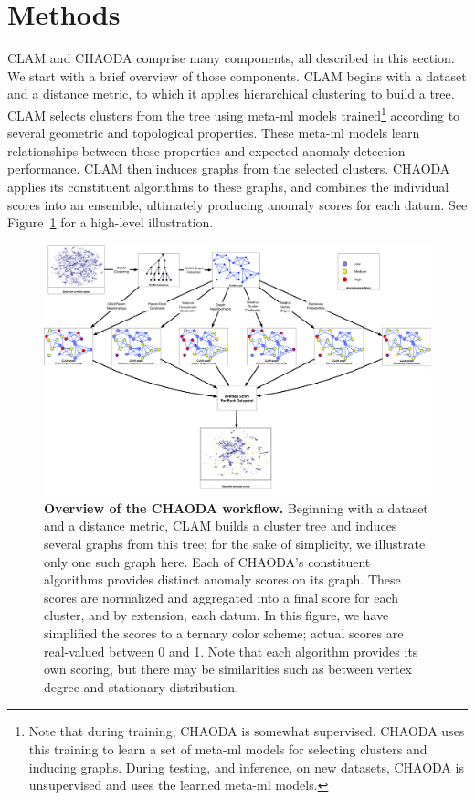 \section{Methods}
\label{sec:methods}

CLAM and CHAODA comprise many components, all described in this section.
We start with a brief overview of those components.
CLAM begins with a dataset and a distance metric, to which it applies hierarchical clustering to build a tree.
CLAM selects clusters from the tree using meta-ml models trained\footnote{Note that during training, CHAODA is somewhat supervised.
CHAODA uses this training to learn a set of meta-ml models for selecting clusters and inducing graphs.
During testing, and inference, on new datasets, CHAODA is unsupervised and uses the learned meta-ml models.} according to several geometric and topological properties.
These meta-ml models learn relationships between these properties and expected anomaly-detection performance.
CLAM then induces graphs from the selected clusters.
CHAODA applies its constituent algorithms to these graphs, and combines the individual scores into an ensemble, ultimately producing anomaly scores for each datum.
See Figure~\ref{fig:methods:chaoda-workflow} for a high-level illustration.


\begin{figure}[ht!]
    \centering
    \includegraphics[width=6in]{images/chaoda-workflow.pdf}
    \caption{\textbf{Overview of the CHAODA workflow.}
        Beginning with a dataset and a distance metric, CLAM builds a cluster tree and induces several graphs from this tree; for the sake of simplicity, we illustrate only one such graph here.
        Each of CHAODA's constituent algorithms provides distinct anomaly scores on its graph.
        These scores are normalized and aggregated into a final score for each cluster, and by extension, each datum.
        In this figure, we have simplified the scores to a ternary color scheme; actual scores are real-valued between 0 and 1.
        Note that each algorithm provides its own scoring, but there may be similarities such as between vertex degree and stationary distribution.}
    \label{fig:methods:chaoda-workflow}
\end{figure}

